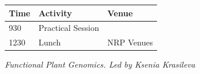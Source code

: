 \documentclass[12pt,]{book}
\theoremstyle{definition}
\theoremstyle{definition}
\theoremstyle{remark}
\begin{document}
\begin{longtable}[]{@{}lll@{}}
\toprule
\begin{minipage}[b]{0.09\columnwidth}\raggedright\strut
Time\strut
\end{minipage} & \begin{minipage}[b]{0.23\columnwidth}\raggedright\strut
Activity\strut
\end{minipage} & \begin{minipage}[b]{0.13\columnwidth}\raggedright\strut
Venue\strut
\end{minipage}\tabularnewline
\midrule
\endhead
\begin{minipage}[t]{0.09\columnwidth}\raggedright\strut
930\strut
\end{minipage} & \begin{minipage}[t]{0.23\columnwidth}\raggedright\strut
Practical Session\strut
\end{minipage} & \begin{minipage}[t]{0.13\columnwidth}\raggedright\strut
\strut
\end{minipage}\tabularnewline
\begin{minipage}[t]{0.09\columnwidth}\raggedright\strut
1230\strut
\end{minipage} & \begin{minipage}[t]{0.23\columnwidth}\raggedright\strut
Lunch\strut
\end{minipage} & \begin{minipage}[t]{0.13\columnwidth}\raggedright\strut
NRP Venues\strut
\end{minipage}\tabularnewline
\bottomrule
\end{longtable}

\emph{Functional Plant Genomics. Led by Ksenia Krasileva}
\end{document}
